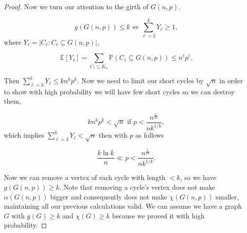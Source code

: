 \documentclass[12pt,twoside,a4paper,bibliography=totocnumbered]{book}
\numberwithin{equation}{section}
\let\log=\ln
\theoremstyle{remark}
\begin{document}
\begin{proof}
Now we turn our attention to the girth of $G(n,p)$.

$$ g(G(n,p)) \leq k \iff \sum_{\ell = 3}^k Y_{\ell} \geq 1,$$
where $Y_{\ell} = |C_{\ell} \colon C_{\ell} \subseteq G(n,p)|$,

$$\mathbb{E}[Y_{\ell}] = \sum_{C_{\ell} \subseteq K_n} \mathbb{P}(C_{\ell} \subseteq G(n,p) ) \leq n^{\ell}p^{\ell}.$$

Then $\sum_{\ell = 3}^k Y_{\ell} \leq kn^kp^k$. Now we need to limit our short cycles by $\sqrt{n}$ in order to show with high probability we will have few short cycles so we can destroy them,

$$kn^kp^k < \sqrt{n} \text{ if } p < \frac{n^{\frac{1}{2k}}}{nk^{1/k}},$$
which implies $\sum_{\ell = 3}^k Y_{\ell} < \sqrt{n}$ then with $p$ as follows

$$\frac{k\log k}{n} \ll p < \frac{n^{\frac{1}{2k}}}{nk^{1/k}}.$$

Now we can remove a vertex of each cycle with length $<k$, so we have $g(G(n,p)) \geq k$. Note that removing a cycle's vertex does not make $\alpha(G(n,p))$ bigger and consequently does not make $\chi(G(n,p))$ smaller, maintaining all our previous calculations valid. We can assume we have a graph $G$ with $g(G) \geq k$ and $\chi(G) \geq k$ because we proved it with high probability.
\end{proof}
\end{document}
